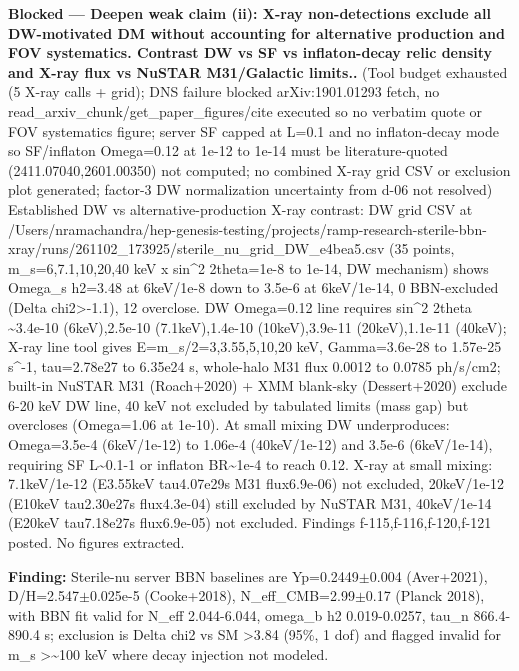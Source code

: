 \documentclass[11pt,a4paper]{article}
\begin{document}
\textbf{Blocked --- Deepen weak claim (ii): X-ray non-detections exclude all DW-motivated DM without accounting for alternative production and FOV systematics. Contrast DW vs SF vs inflaton-decay relic density and X-ray flux vs NuSTAR M31/Galactic limits..} (Tool budget exhausted (5 X-ray calls + grid); DNS failure blocked arXiv:1901.01293 fetch, no read\_arxiv\_chunk/get\_paper\_figures/cite executed so no verbatim quote or FOV systematics figure; server SF capped at L=0.1 and no inflaton-decay mode so SF/inflaton Omega=0.12 at 1e-12 to 1e-14 must be literature-quoted (2411.07040,2601.00350) not computed; no combined X-ray grid CSV or exclusion plot generated; factor-3 DW normalization uncertainty from d-06 not resolved) Established DW vs alternative-production X-ray contrast: DW grid CSV at /Users/nramachandra/hep-genesis-testing/projects/ramp-research-sterile-bbn-xray/runs/261102\_173925/sterile\_nu\_grid\_DW\_e4bea5.csv (35 points, m\_s=6,7.1,10,20,40 keV x sin\textasciicircum{}2 2theta=1e-8 to 1e-14, DW mechanism) shows Omega\_s h2=3.48 at 6keV/1e-8 down to 3.5e-6 at 6keV/1e-14, 0 BBN-excluded (Delta chi2\textgreater{}-1.1), 12 overclose. DW Omega=0.12 line requires sin\textasciicircum{}2 2theta \textasciitilde{}3.4e-10 (6keV),2.5e-10 (7.1keV),1.4e-10 (10keV),3.9e-11 (20keV),1.1e-11 (40keV); X-ray line tool gives E=m\_s/2=3,3.55,5,10,20 keV, Gamma=3.6e-28 to 1.57e-25 s\textasciicircum{}-1, tau=2.78e27 to 6.35e24 s, whole-halo M31 flux 0.0012 to 0.0785 ph/s/cm2; built-in NuSTAR M31 (Roach+2020) + XMM blank-sky (Dessert+2020) exclude 6-20 keV DW line, 40 keV not excluded by tabulated limits (mass gap) but overcloses (Omega=1.06 at 1e-10). At small mixing DW underproduces: Omega=3.5e-4 (6keV/1e-12) to 1.06e-4 (40keV/1e-12) and 3.5e-6 (6keV/1e-14), requiring SF L\textasciitilde{}0.1-1 or inflaton BR\textasciitilde{}1e-4 to reach 0.12. X-ray at small mixing: 7.1keV/1e-12 (E3.55keV tau4.07e29s M31 flux6.9e-06) not excluded, 20keV/1e-12 (E10keV tau2.30e27s flux4.3e-04) still excluded by NuSTAR M31, 40keV/1e-14 (E20keV tau7.18e27s flux6.9e-05) not excluded. Findings f-115,f-116,f-120,f-121 posted. No figures extracted.

\textbf{Finding:} Sterile-nu server BBN baselines are Yp=0.2449$\pm$0.004 (Aver+2021), D/H=2.547$\pm$0.025e-5 (Cooke+2018), N\_eff\_CMB=2.99$\pm$0.17 (Planck 2018), with BBN fit valid for N\_eff 2.044-6.044, omega\_b h2 0.019-0.0257, tau\_n 866.4-890.4 s; exclusion is Delta chi2 vs SM \textgreater{}3.84 (95\%, 1 dof) and flagged invalid for m\_s \textgreater{}\textasciitilde{}100 keV where decay injection not modeled.
\end{document}
